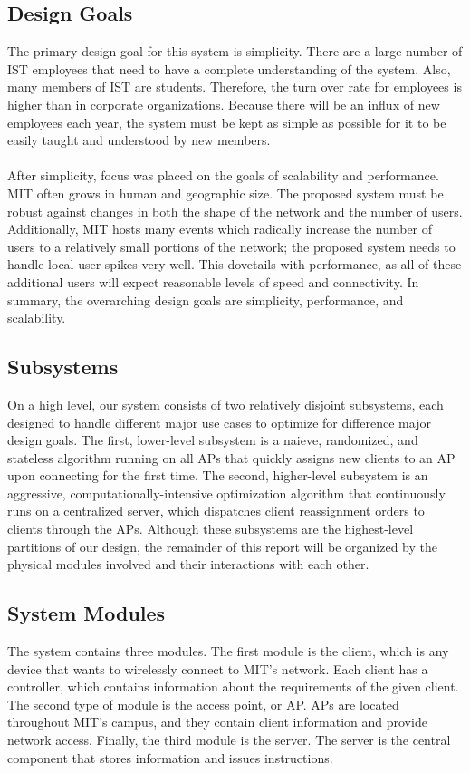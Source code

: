 \documentclass[10pt,journal,compsoc]{IEEEtran}
\begin{document}
        \subsection{Design Goals}
        
        The primary design goal for this system is simplicity. There are a large number of IST employees that need to have a complete understanding of the system. Also, many members of IST are students. Therefore, the turn over rate for employees is higher than in corporate organizations. Because there will be an influx of new employees each year, the system must be kept as simple as possible for it to be easily taught and understood by new members.\\
        \\
        After simplicity, focus was placed on the goals of scalability and performance. MIT often grows in human and geographic size. The proposed system must be robust against changes in both the shape of the network and the number of users. Additionally, MIT hosts many events which radically increase the number of users to a relatively small portions of the network; the proposed system needs to handle local user spikes very well. This dovetails with performance, as all of these additional users will expect reasonable levels of speed and connectivity. In summary, the overarching design goals are simplicity, performance, and scalability. 
        
        \subsection{Subsystems}
        On a high level, our system consists of two relatively disjoint subsystems, each designed to handle different major use cases to optimize for difference major design goals. The first, lower-level subsystem is a naieve, randomized, and stateless algorithm running on all APs that quickly assigns new clients to an AP upon connecting for the first time. The second, higher-level subsystem is an aggressive, computationally-intensive optimization algorithm that continuously runs on a centralized server, which dispatches client reassignment orders to clients through the APs. Although these subsystems are the highest-level partitions of our design, the remainder of this report will be organized by the physical modules involved and their interactions with each other.
        
		\subsection{System Modules}
		The system contains three modules. The first module is the client, which is any device that wants to wirelessly connect to MIT's network. Each client has a controller, which contains information about the requirements of the given client. The second type of module is the access point, or AP. APs are located throughout MIT's campus, and they contain client information and provide network access. Finally, the third module is the server. The server is the central component that stores information and issues instructions.
		
\end{document}
